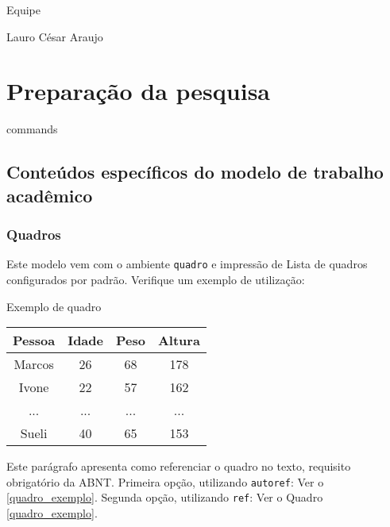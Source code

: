 \documentclass[
    12pt,
openright,             %
    twoside,               %
    a4paper,
french,            %
ngerman,           %
spanish,           %
brazil,            %
british,           %
    ]{abntex2}
\begin{document}
Equipe \abnTeX

Lauro César Araujo

\part{Preparação da pesquisa}

{commands}

\chapter{Conteúdos específicos do modelo de trabalho acadêmico}\label{cap_trabalho_academico}

\section{Quadros}

Este modelo vem com o ambiente \texttt{quadro} e impressão de Lista de quadros
configurados por padrão. Verifique um exemplo de utilização:

\begin{quadro}[htb]
\caption{\label{quadro_exemplo}Exemplo de quadro}
\begin{tabular}{|c|c|c|c|}
    \hline
    \textbf{Pessoa} & \textbf{Idade} & \textbf{Peso} & \textbf{Altura} \\ \hline
    Marcos          & 26             & 68            & 178             \\ \hline
    Ivone           & 22             & 57            & 162             \\ \hline
    ...             & ...            & ...           & ...             \\ \hline
    Sueli           & 40             & 65            & 153             \\ \hline
\end{tabular}
\end{quadro}

Este parágrafo apresenta como referenciar o quadro no texto, requisito
obrigatório da ABNT.
Primeira opção, utilizando \texttt{autoref}: Ver o \autoref{quadro_exemplo}.
Segunda opção, utilizando  \texttt{ref}: Ver o Quadro \ref{quadro_exemplo}.

\end{document}
